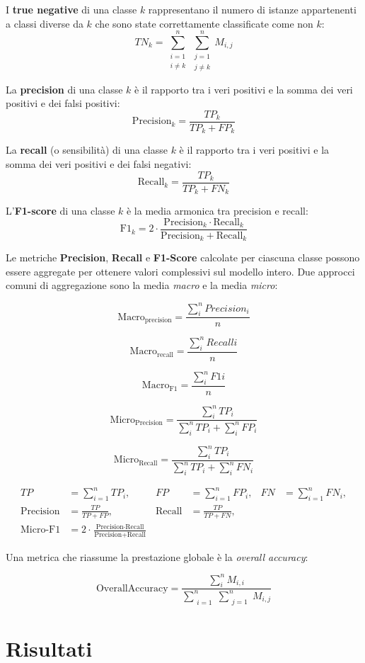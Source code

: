 I \textbf{true negative} di una classe $k$ rappresentano il numero di istanze appartenenti a
classi diverse da $k$ che sono state correttamente classificate come non $k$:
\[
    TN_{k} = \sum_{\substack{i=1 \\ i \neq k}}^{n}
    \sum_{\substack{j=1 \\ j \neq k}}^{n} M_{i,j}
\]

La \textbf{precision} di una classe $k$ è il rapporto tra i veri positivi e la
somma dei veri positivi e dei falsi positivi:
\[
    \mathrm{Precision}_k = \frac{TP_k}{TP_k + FP_k}
\]

La \textbf{recall} (o sensibilità) di una classe $k$ è il rapporto tra i veri
positivi e la somma dei veri positivi e dei falsi negativi:
\[
    \mathrm{Recall}_k = \frac{TP_k}{TP_k + FN_k}
\]

L'\textbf{F1-score} di una classe $k$ è la media armonica tra precision e recall:
\[
    \mathrm{F1}_k = 2 \cdot \frac{\mathrm{Precision}_k \cdot \mathrm{Recall}_k}
    {\mathrm{Precision}_k + \mathrm{Recall}_k}
\]

Le metriche \textbf{Precision}, \textbf{Recall} e \textbf{F1-Score} calcolate per ciascuna classe
possono essere aggregate per ottenere valori complessivi sul modello intero. Due approcci
comuni di aggregazione sono la media \textit{macro} e la media \textit{micro}:

\[
    \mathrm{Macro_{precision}} = \frac{\sum_{i}^{n} Precision_{i}}{n}
\]

\[
    \mathrm{Macro_{recall}} = \frac{\sum_{i}^{n} Recall{i}}{n}
\]

\[
    \mathrm{Macro_{F1}} = \frac{\sum_{i}^{n} F1{i}}{n}
\]

\[
    \mathrm{Micro_{Precision}} = \frac{\sum_{i}^{n} TP_{i}}{\sum_{i}^{n} TP_{i} + \sum_{i}^{n} FP_{i}}
\]

\[
    \mathrm{Micro_{Recall}} = \frac{\sum_{i}^{n} TP_{i}}{\sum_{i}^{n} TP_{i} + \sum_{i}^{n} FN_{i}}
\]

\[
    \begin{aligned}
        TP               & = \sum_{i=1}^{n} TP_i,                                                                  & FP            & = \sum_{i=1}^{n} FP_i, & FN & = \sum_{i=1}^{n} FN_i, \\[1mm]
        \text{Precision} & = \frac{TP}{TP + FP},                                                                   & \text{Recall} & = \frac{TP}{TP + FN},                                \\[1mm]
        \text{Micro-F1}  & = 2 \cdot \frac{\text{Precision} \cdot \text{Recall}}{\text{Precision} + \text{Recall}}
    \end{aligned}
\]

Una metrica che riassume la prestazione globale è la \textit{overall accuracy}:

\[
    \mathrm{OverallAccuracy} = \frac{\sum_{i}^{n} M_{i,i}}{ \sum_{\substack{i=1}}^{n}
        \sum_{\substack{j=1 }}^{n} M_{i,j}}
\]

\section{Risultati}